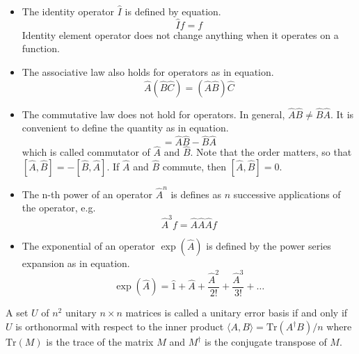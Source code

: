 \begin{itemize}
    \item The identity operator $\hat{I}$ is defined by equation.
        \begin{equation}
            \hat{I}f = f
            \label{eq:identity_operator}
        \end{equation}
          Identity element operator does not change anything when it operates on a function.
    \item The associative law also holds for operators as in equation.
        \begin{equation}
            \hat{A}(\hat{B}\hat{C}) = (\hat{A}\hat{B})\hat{C}
            \label{eq:associative_operator}
        \end{equation}
    \item The commutative law does not hold for operators. In general, $\hat{A}\hat{B} \neq \hat{B}\hat{A}$.  It is convenient to define the quantity as in equation.
        \begin{equation}
            [\hat{A}, \hat{B}] = \hat{A}\hat{B} - \hat{B}\hat{A}
            \label{eq:commutator_operator}
        \end{equation}
            which is called commutator of $\hat{A}$ and $\hat{B}$. Note that the order matters, so that $[\hat{A}, \hat{B}] = -[\hat{B}, \hat{A}]$. If $\hat{A}$ and $\hat{B}$ commute, then $[\hat{A}, \hat{B}] = 0$.
    \item The n-th power of an operator $\hat{A}^n$ is defines as $n$ successive applications of the operator, e.g.
        \begin{equation}
            \hat{A}^3f = \hat{A}\hat{A}\hat{A}f
            \label{eq:power_operator}
        \end{equation}
    \item The exponential of an operator $\exp(\hat{A})$ is defined by the power series expansion as in equation.
        \begin{equation}
            \exp(\hat{A}) = \hat{1} + \hat{A} + \frac{\hat{A}^2}{2!} + \frac{\hat{A}^3}{3!} + \ldots
            \label{eq:exponential_operator}
        \end{equation}
  \end{itemize}

\begin{definition}
A set $U$ of $n^2$ unitary $n \times n$ matrices is called a unitary error basis if and only if $U$ is orthonormal with respect to the inner product $\langle A, B \rangle = {\textrm{Tr}(A^\dagger B)} / n$ where $\textrm{Tr}(M)$ is the trace of the matrix $M$ and $M^\dagger$ is the conjugate transpose of $M$.
\end{definition}

